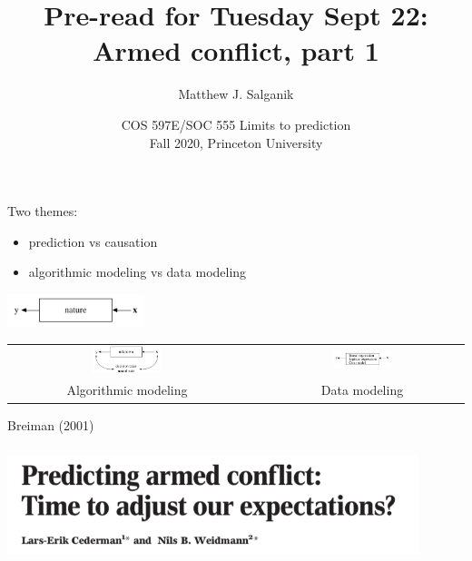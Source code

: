 \documentclass[aspectratio=169]{beamer}
\title[]{Pre-read for Tuesday Sept 22:\\Armed conflict, part 1}
\author[]{Matthew J. Salganik}
\institute[]{}
\date[]{COS 597E/SOC 555 Limits to prediction\\Fall 2020, Princeton University}
\begin{document}
\frame{\titlepage}
\begin{frame}
\frametitle{}

Two themes:
\begin{itemize}
\item prediction vs causation
\pause
\item algorithmic modeling vs data modeling
\end{itemize}
 
\end{frame}
\begin{frame}

\begin{center}
\includegraphics[width=0.30\textwidth]{figures/breiman_nature}
\end{center}

\pause

\begin{center}
\begin{tabular}{ccc}
\includegraphics[width=0.30\textwidth]{figures/breiman_algorithmic_modeling} & & \includegraphics[width=0.30\textwidth]{figures/breiman_data_modeling} \\
\LARGE{Algorithmic modeling} &  & \LARGE{Data modeling}
\end{tabular}
\end{center}

\vfill
Breiman (2001)

\end{frame}
\begin{frame}
\frametitle{}

\begin{center}
\includegraphics[width=0.9\textwidth]{figures/cederman_predicting_2017_title}
\end{center}

\end{frame}
\end{document}
